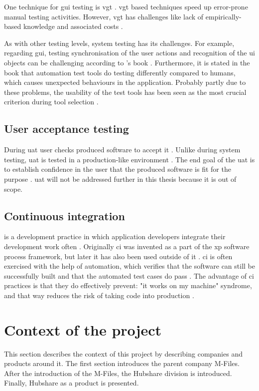 One technique for \gls{gui} testing is \gls{vgt} \cite{borjesson2012automated}. \gls{vgt} based techniques speed up error-prone manual testing activities. However, \gls{vgt} has challenges like lack of empirically-based knowledge and associated costs \cite{alegroth2015visual}.

As with other testing levels, system testing has its challenges. For example, regarding \gls{gui}, testing synchronisation of the user actions and recognition of the \gls{ui} objects can be challenging according to \citeauthor{graham2012experiences}'s book \cite{graham2012experiences}. Furthermore, it is stated in the book that automation test tools do testing differently compared to humans, which causes unexpected behaviours in the application. Probably partly due to these problems, the usability of the test tools has been seen as the most crucial criterion during tool selection \cite{paivi2017choosing}.

\subsection{User acceptance testing}
During \gls{uat} user checks produced software to accept it \cite{pandit2015agileuat}. Unlike during system testing, \gls{uat} is tested in a production-like environment \cite{otaduy2017user}. The end goal of the \gls{uat} is to establish confidence in the user that the produced software is fit for the purpose \cite{pandit2015agileuat}. \gls{uat} will not be addressed further in this thesis because it is out of scope.

\subsection{Continuous integration}
 is a development practice in which application developers integrate their development work often \cite{fowler2006continuous}. Originally \gls{ci} was invented as a part of the \gls{xp} software process framework, but later it has also been used outside of it \cite{meyer2014continuous}. \gls{ci} is often exercised with the help of automation, which verifies that the software can still be successfully built and that the automated test cases do pass \cite{fowler2006continuous}. The advantage of \gls{ci} practices is that they do effectively prevent: "it works on my machine" syndrome, and that way reduces the risk of taking code into production \cite{meyer2014continuous}.

\section{Context of the project}\label{section:context_of_the_project}
This section describes the context of this project by describing companies and products around it. The first section introduces the parent company M-Files. After the introduction of the M-Files, the Hubshare division is introduced. Finally, Hubshare as a product is presented.

